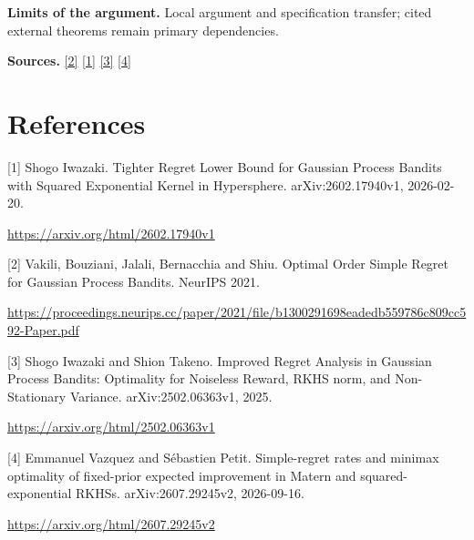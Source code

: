 \documentclass[10pt,a4paper]{article}
\begin{document}
\textbf{Limits of the argument.} Local argument and specification transfer; cited external theorems remain primary dependencies.

\textbf{Sources.} \href{https://proceedings.neurips.cc/paper/2021/file/b1300291698eadedb559786c809cc592-Paper.pdf}{[2]} \href{https://arxiv.org/html/2602.17940v1}{[1]} \href{https://arxiv.org/html/2502.06363v1}{[3]} \href{https://arxiv.org/html/2607.29245v2}{[4]}

\section{References}
[1] Shogo Iwazaki. Tighter Regret Lower Bound for Gaussian Process Bandits with Squared Exponential Kernel in Hypersphere. arXiv:2602.17940v1, 2026-02-20.

\url{https://arxiv.org/html/2602.17940v1}

[2] Vakili, Bouziani, Jalali, Bernacchia and Shiu. Optimal Order Simple Regret for Gaussian Process Bandits. NeurIPS 2021.

\url{https://proceedings.neurips.cc/paper/2021/file/b1300291698eadedb559786c809cc592-Paper.pdf}

[3] Shogo Iwazaki and Shion Takeno. Improved Regret Analysis in Gaussian Process Bandits: Optimality for Noiseless Reward, RKHS norm, and Non-Stationary Variance. arXiv:2502.06363v1, 2025.

\url{https://arxiv.org/html/2502.06363v1}

[4] Emmanuel Vazquez and Sébastien Petit. Simple-regret rates and minimax optimality of fixed-prior expected improvement in Matern and squared-exponential RKHSs. arXiv:2607.29245v2, 2026-09-16.

\url{https://arxiv.org/html/2607.29245v2}
\end{document}
